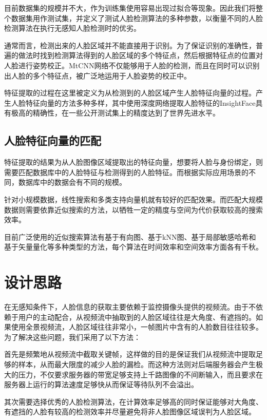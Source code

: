 目前数据集的规模并不大，作为训练集使用容易出现过拟合等现象。因此我们将整个数据集用作测试集，并定义了测试人脸检测算法的多种参数，以衡量不同的人脸检测算法在执行无感知人脸检测时的优劣。

通常而言，检测出来的人脸区域并不能直接用于识别。为了保证识别的准确性，普遍的做法时找到检测算法得到的人脸区域的多个特征点，然后根据特征点的位置对人脸进行姿势校正。MtCNN网络\cite{zhang2016joint}不仅能够用于人脸的检测，而且在同时可以识别出人脸的多个特征点，被广泛地运用于人脸姿势的校正中。

特征提取的过程在这里被定义为从检测到的人脸区域产生人脸特征向量的过程。产生人脸特征向量的方法多种多样，其中使用深度网络提取人脸特征的InsightFace\cite{deng2018arcface}具有极高的精确性，在一些公开测试集上的精度达到了世界先进水平。

\subsection{人脸特征向量的匹配}

特征提取的结果为从人脸图像区域提取出的特征向量，想要将人脸与身份绑定，则需要匹配数据库中的人脸特征与检测得到的人脸特征。而根据实际应用场景的不同，数据库中的数据会有不同的规模。

针对小规模数据，线性搜索和多类支持向量机就有较好的匹配效果。而匹配大规模数据则需要依靠近似搜索的方法，以牺牲一定的精度与空间为代价获取较高的搜索效率。

目前广泛使用的近似搜索算法有基于有向图、基于kNN图、基于局部敏感哈希和基于矢量量化等多种类型的方法，每个算法在时间效率和空间效率方面各有千秋。

\section{设计思路}

在无感知条件下，人脸信息的获取主要依赖于监控摄像头提供的视频流。由于不依赖于用户的主动配合，从视频流中抽取到的人脸区域往往是大角度、有遮挡的。如果使用全景视频流，人脸区域往往非常小，一帧图片中含有的人脸数目往往较多。为了解决这些问题，我们采用了以下方法：

首先是频繁地从视频流中截取关键帧，这样做的目的是保证我们从视频流中提取足够的样本，从而最大限度的减少人脸的漏检。而这种方法则对后端服务器会产生极大的压力，不仅要求服务器的带宽足够支持上千路图像的不间断输入，而且要求在服务器上运行的算法速度足够快从而保证等待队列不会溢出。

其次需要选择优秀的人脸检测算法，在计算效率足够高的同时保证能够对大角度、有遮挡的人脸有较高的检测效率并尽量避免将非人脸图像区域误判为人脸区域。

